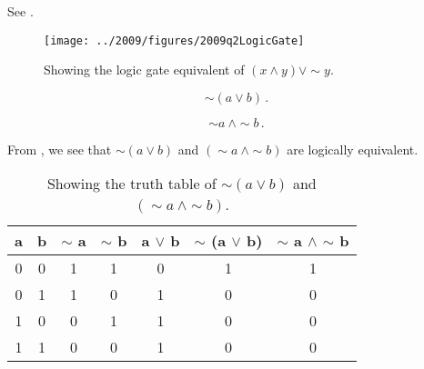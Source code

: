 \begin{subquestions}
\subquestion

See .

\begin{figure}
	\begin{center}
		\texttt{[image: ../2009/figures/2009q2LogicGate]}
		\caption{\label{2009:q2:fig:LogicGates} Showing the logic gate equivalent of $(x \land y) \lor \sim y$.}
	\end{center}
\end{figure}


\subquestion

\begin{subsubquestions}
	
\subsubquestion

\begin{equation}
	\sim (a \lor b)\,.
\end{equation}

\subsubquestion

\begin{equation}
	\sim a ~\land \sim b\,.
\end{equation}

\subsubquestion

From , we see that $\sim (a \lor b)$ and $(\sim a ~\land \sim b)$ are logically equivalent.

\begin{table}[ht]
	\centering
	\begin{tabular}{|c|c|c|c|c|c|c|}
		\hline
		a & b & $\sim$ a & $\sim$ b & a $\lor$ b & $\sim$ (a $\lor$ b) & $\sim$ a $\land$ $\sim$ b \\
		\hline
		0 & 0 & 1 & 1 & 0 & 1 & 1 \\
		0 & 1 & 1 & 0 & 1 & 0 & 0 \\
		1 & 0 & 0 & 1 & 1 & 0 & 0 \\
		1 & 1 & 0 & 0 & 1 & 0 & 0 \\
		\hline
	\end{tabular}
	\caption{\label{2009:q2:tab:TruthTab2} Showing the truth table of $\sim (a \lor b)$ and $(\sim a ~\land \sim b)$.}
\end{table}

\end{subsubquestions}

\end{subquestions}


